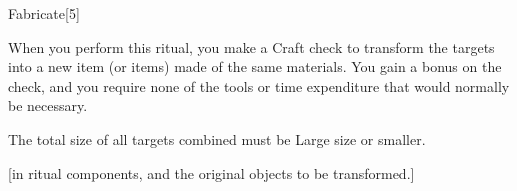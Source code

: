 \begin{spellsection}{Fabricate}[5]
    \begin{spellheader}
    \end{spellheader}
    \begin{spellcontent}
        \begin{spelltargetinginfo}
            \spellrng{\rngmed}
        \end{spelltargetinginfo}
        \begin{spelleffects}
            \spelleffect When you perform this ritual, you make a Craft check to transform the targets into a new item (or items) made of the same materials. You gain a  bonus on the check, and you require none of the tools or time expenditure that would normally be necessary.

            The total size of all targets combined must be Large size or smaller.
        \end{spelleffects}
    \end{spellcontent}
    \begin{spellfooter}
        [in ritual components, and the original objects to be transformed.]
    \end{spellfooter}
    \begin{spellaugments}
    \end{spellaugments}
\end{spellsection}

